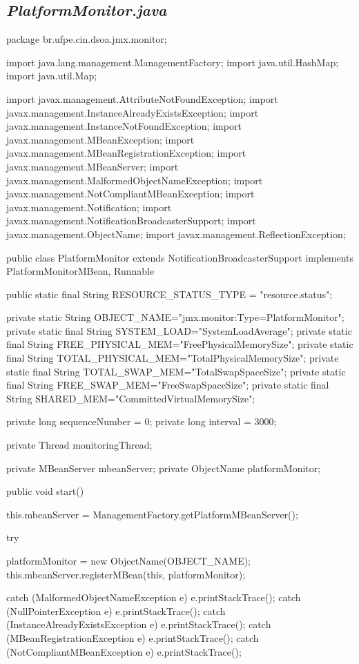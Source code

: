\subsection*{\!\textsl{\textbf{PlatformMonitor.java}}}
\small
\begin{verbatimtab}[4]
package br.ufpe.cin.dsoa.jmx.monitor;

import java.lang.management.ManagementFactory;
import java.util.HashMap;
import java.util.Map;

import javax.management.AttributeNotFoundException;
import javax.management.InstanceAlreadyExistsException;
import javax.management.InstanceNotFoundException;
import javax.management.MBeanException;
import javax.management.MBeanRegistrationException;
import javax.management.MBeanServer;
import javax.management.MalformedObjectNameException;
import javax.management.NotCompliantMBeanException;
import javax.management.Notification;
import javax.management.NotificationBroadcasterSupport;
import javax.management.ObjectName;
import javax.management.ReflectionException;

public class PlatformMonitor extends NotificationBroadcasterSupport 
	implements PlatformMonitorMBean, Runnable {

	public static final String RESOURCE_STATUS_TYPE = "resource.status";

	private static String OBJECT_NAME="jmx.monitor:Type=PlatformMonitor";
	private static final String SYSTEM_LOAD="SystemLoadAverage";
	private static final String FREE_PHYSICAL_MEM="FreePhysicalMemorySize";
	private static final String TOTAL_PHYSICAL_MEM="TotalPhysicalMemorySize";
	private static final String TOTAL_SWAP_MEM="TotalSwapSpaceSize";
	private static final String FREE_SWAP_MEM="FreeSwapSpaceSize";
	private static final String SHARED_MEM="CommittedVirtualMemorySize";

	private long sequenceNumber = 0;
	private long interval = 3000;

	private Thread monitoringThread;

	private MBeanServer mbeanServer;
	private ObjectName platformMonitor;

	public void start() {
		this.mbeanServer = ManagementFactory.getPlatformMBeanServer();

		try {
			platformMonitor = new ObjectName(OBJECT_NAME);
			this.mbeanServer.registerMBean(this, platformMonitor);

		} catch (MalformedObjectNameException e) {
			e.printStackTrace();
		} catch (NullPointerException e) {
			e.printStackTrace();
		} catch (InstanceAlreadyExistsException e) {
			e.printStackTrace();
		} catch (MBeanRegistrationException e) {
			e.printStackTrace();
		} catch (NotCompliantMBeanException e) {
			e.printStackTrace();
		}
	}

}
\end{verbatimtab}
